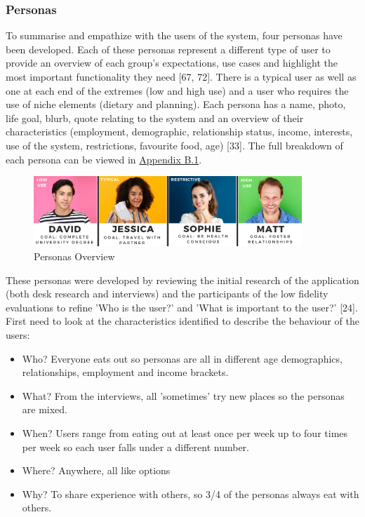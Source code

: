 \documentclass[a4 paper, 12pt]{article}
\begin{document}
    \subsubsection{Personas}
    To summarise and empathize with the users of the system, four personas have been developed. Each of these personas represent a different type of user to provide an overview of each group's expectations, use cases and highlight the most important functionality they need [67, 72]. There is a typical user as well as one at each end of the extremes (low and high use) and a user who requires the use of niche elements (dietary and planning). Each persona has a name, photo, life goal, blurb, quote relating to the system and an overview of their characteristics (employment, demographic, relationship status, income, interests, use of the system, restrictions, favourite food, age) [33]. The full breakdown of each persona can be viewed in \hyperref[sec:B.1]{Appendix B.1}.
    \begin{figure} [H]
        \centering
        \includegraphics[width=0.9\textwidth, frame]
            {./Med_Fidelity/Med_Report/images/personas_overview.PNG}  
        \caption{Personas Overview}
    \end{figure} 
    
    These personas were developed by reviewing the initial research of the application (both desk research and interviews) and the participants of the low fidelity evaluations to refine 'Who is the user?' and 'What is important to the user?' [24]. First need to look at the characteristics identified to describe the behaviour of the users:
        \begin{itemize}
            \item Who? Everyone eats out so personas are all in different age demographics, relationships, employment and income brackets.
            \item What? From the interviews, all 'sometimes' try new places so the personas are mixed. 
            \item When? Users range from eating out at least once per week up to four times per week so each user falls under a different number.
            \item Where? Anywhere, all like options
            \item Why? To share experience with others, so 3/4 of the personas always eat with others.
        \end{itemize}
\end{document}
